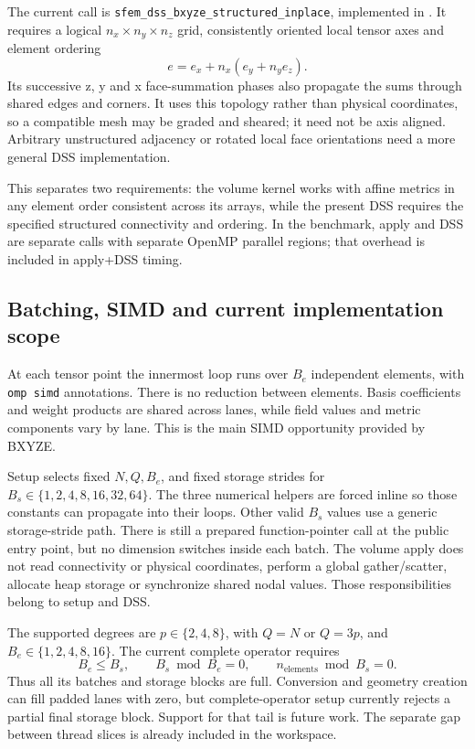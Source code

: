 \documentclass[11pt]{article}
\begin{document}
The current call is
\texttt{sfem\_dss\_bxyze\_structured\_inplace}, implemented in
.
It requires a logical \(n_x\times n_y\times n_z\) grid, consistently oriented
local tensor axes and element ordering
\[
 e=e_x+n_x(e_y+n_ye_z).
\]
Its successive z, y and x face-summation phases also propagate the sums
through shared edges and corners. It uses this topology rather than physical
coordinates, so a compatible mesh may be graded and sheared; it need not be
axis aligned. Arbitrary unstructured adjacency or rotated local face
orientations need a more general DSS implementation.

This separates two requirements: the volume kernel works with affine metrics
in any element order consistent across its arrays, while the present DSS
requires the specified structured connectivity and ordering.
In the benchmark, apply and DSS are separate calls with separate OpenMP
parallel regions; that overhead is included in apply+DSS timing.

\subsection{Batching, SIMD and current implementation scope}

At each tensor point the innermost loop runs over \(B_e\) independent elements,
with \texttt{omp simd} annotations. There is no reduction between elements.
Basis coefficients and weight products are shared across lanes, while field
values and metric components vary by lane. This is the main SIMD opportunity
provided by BXYZE.

Setup selects fixed \(N,Q,B_e\), and fixed storage strides for
\(B_s\in\{1,2,4,8,16,32,64\}\). The three numerical helpers are forced inline
so those constants can propagate into their loops. Other valid \(B_s\) values
use a generic storage-stride path. There is still a prepared function-pointer
call at the public entry point, but no dimension switches inside each batch.
The volume apply does not read connectivity or physical coordinates, perform
a global gather/scatter, allocate heap storage or synchronize shared nodal
values. Those responsibilities belong to setup and DSS.

The supported degrees are \(p\in\{2,4,8\}\), with \(Q=N\) or \(Q=3p\), and
\(B_e\in\{1,2,4,8,16\}\). The current complete operator requires
\[
 B_e\le B_s,\qquad B_s\bmod B_e=0,\qquad
 n_{\mathrm{elements}}\bmod B_s=0.
\]
Thus all its batches and storage blocks are full. Conversion and geometry
creation can fill padded lanes with zero, but complete-operator setup currently
rejects a partial final storage block. Support for that tail is future work.
The separate gap between thread slices is already included in the workspace.
\end{document}
